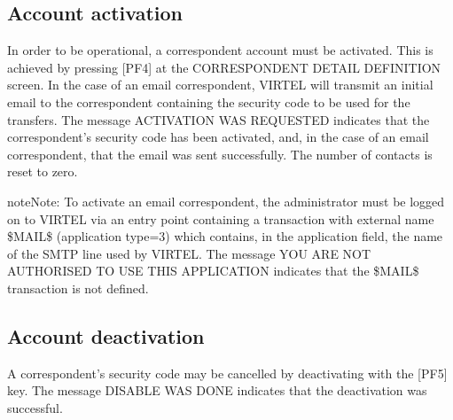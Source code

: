 \documentclass[letterpaper,10pt,english]{sphinxmanual}
\begin{document}
\label{\detokenize{audit_operations_ and_performance:v462ap-account-activation}}
\ignorespaces 

\subsection{Account activation}
\label{\detokenize{audit_operations_ and_performance:account-activation}}\label{\detokenize{audit_operations_ and_performance:index-53}}
\sphinxAtStartPar
In order to be operational, a correspondent account must be activated. This is achieved by pressing {[}PF4{]} at the CORRESPONDENT DETAIL DEFINITION screen. In the case of an e\sphinxhyphen{}mail correspondent, VIRTEL will transmit an initial email to the correspondent containing the security code to be used for the transfers. The message ACTIVATION WAS REQUESTED indicates that the correspondent’s security code has been activated, and, in the case of an e\sphinxhyphen{}mail
correspondent, that the e\sphinxhyphen{}mail was sent successfully. The number of contacts is reset to zero.

\begin{sphinxadmonition}{note}{Note:}
\sphinxAtStartPar
To activate an e\sphinxhyphen{}mail correspondent, the administrator must be logged on to VIRTEL via an entry point containing a transaction with external name \$MAIL\$ (application type=3) which contains, in the application field, the name of the SMTP line used by VIRTEL. The message YOU ARE NOT AUTHORISED TO USE THIS APPLICATION indicates that the \$MAIL\$ transaction is not defined.
\end{sphinxadmonition}

\ignorespaces 

\subsection{Account deactivation}
\label{\detokenize{audit_operations_ and_performance:account-deactivation}}\label{\detokenize{audit_operations_ and_performance:index-54}}
\sphinxAtStartPar
A correspondent’s security code may be cancelled by deactivating with the {[}PF5{]} key. The message DISABLE WAS DONE indicates that the deactivation was successful.
\end{document}
